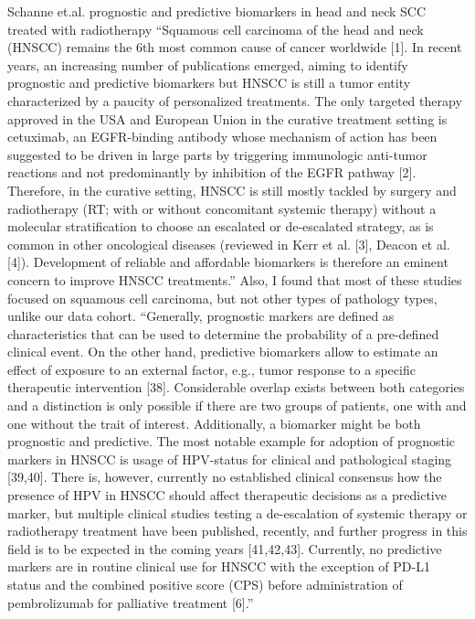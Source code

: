 \documentclass{article}%
\begin{document}
%
Schanne et.al. prognostic and predictive biomarkers in head and neck SCC treated with radiotherapy %
\newline%
\newline%
%
“Squamous cell carcinoma of the head and neck (HNSCC) remains the 6th most common cause of cancer worldwide {[}1{]}. In recent years, an increasing number of publications emerged, aiming to identify prognostic and predictive biomarkers but HNSCC is still a tumor entity characterized by a paucity of personalized treatments. The only targeted therapy approved in the USA and European Union in the curative treatment setting is cetuximab, an EGFR{-}binding antibody whose mechanism of action has been suggested to be driven in large parts by triggering immunologic anti{-}tumor reactions and not predominantly by inhibition of the EGFR pathway {[}2{]}. Therefore, in the curative setting, HNSCC is still mostly tackled by surgery and radiotherapy (RT; with or without concomitant systemic therapy) without a molecular stratification to choose an escalated or de{-}escalated strategy, as is common in other oncological diseases (reviewed in Kerr et al. {[}3{]}, Deacon et al. {[}4{]}). Development of reliable and affordable biomarkers is therefore an eminent concern to improve HNSCC treatments.” %
\newline%
\newline%
%
Also, I found that most of these studies focused on squamous cell carcinoma, but not other types of pathology types, unlike our data cohort. %
\newline%
\newline%
%
“Generally, prognostic markers are defined as characteristics that can be used to determine the probability of a pre{-}defined clinical event. On the other hand, predictive biomarkers allow to estimate an effect of exposure to an external factor, e.g., tumor response to a specific therapeutic intervention {[}38{]}. Considerable overlap exists between both categories and a distinction is only possible if there are two groups of patients, one with and one without the trait of interest. Additionally, a biomarker might be both prognostic and predictive. The most notable example for adoption of prognostic markers in HNSCC is usage of HPV{-}status for clinical and pathological staging {[}39,40{]}. There is, however, currently no established clinical consensus how the presence of HPV in HNSCC should affect therapeutic decisions as a predictive marker, but multiple clinical studies testing a de{-}escalation of systemic therapy or radiotherapy treatment have been published, recently, and further progress in this field is to be expected in the coming years {[}41,42,43{]}. Currently, no predictive markers are in routine clinical use for HNSCC with the exception of PD{-}L1 status and the combined positive score (CPS) before administration of pembrolizumab for palliative treatment {[}6{]}.”%
\end{document}
